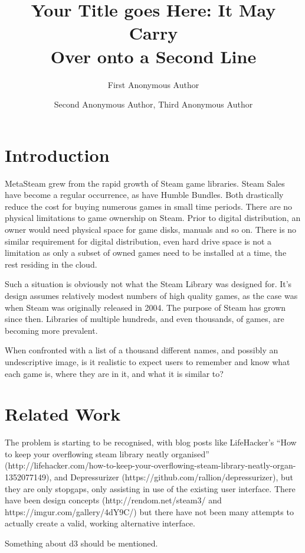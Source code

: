 \documentclass[11pt]{article}
\title{\addvspace{-2\baselineskip}Your Title goes Here: It May Carry \\
Over onto a Second Line}
\author{First Anonymous Author}
\affil{Institutional Affiliation \\
Address line 1 \\
Address line 2 \\
telephone \\
firstauthor@institution.com }
\author{Second Anonymous Author, Third Anonymous Author}
\affil{Institutional Affiliation \\
Address line 1 \\
Address line 2 \\
telephone \\
secondauthor@institution.com, thirdauthor@institution.com}
\date{\vspace{-60pt}}
\begin{document}
\newpage
{}  
\maketitle
{}
\copyrightnotice

\section{Introduction}
MetaSteam grew from the rapid growth of Steam game libraries. Steam Sales have become a regular occurrence, as have Humble Bundles. Both drastically reduce the cost for buying numerous games in small time periods.
There are no physical limitations to game ownership on Steam. Prior to digital distribution, an owner would need physical space for game disks, manuals and so on. There is no similar requirement for digital distribution, even hard drive space is not a limitation as only a subset of owned games need to be installed at a time, the rest residing in the cloud.

Such a situation is obviously not what the Steam Library was designed for. It's design assumes relatively modest numbers of high quality games, as the case was when Steam was originally released in 2004. The purpose of Steam has grown since then. Libraries of multiple hundreds, and even thousands, of games, are becoming more prevalent.

When confronted with a list of a thousand different names, and possibly an undescriptive image, is it realistic to expect users to remember and know what each game is, where they are in it, and what it is similar to?

\section{Related Work}
The problem is starting to be recognised, with blog posts like LifeHacker's ``How to keep your overflowing steam library neatly organised'' (http://lifehacker.com/how-to-keep-your-overflowing-steam-library-neatly-organ-1352077149),
and Depressurizer (https://github.com/rallion/depressurizer), but they are only stopgaps, only assisting in use of the existing user interface. There have been design concepts (http://rendom.net/steam3/ and https://imgur.com/gallery/4dY9C/) but there have not been many attempts to actually create a valid, working alternative interface.

Something about d3 should be mentioned. 
\end{document}
